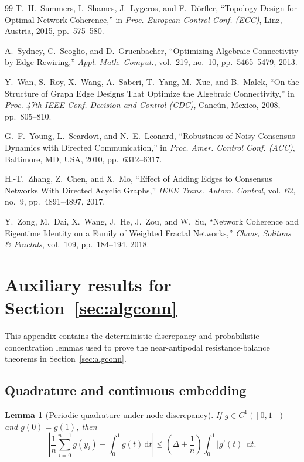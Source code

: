 \documentclass[11pt]{article}
\numberwithin{equation}{section}
\newtheorem{lemma}[theorem]{Lemma}
\theoremstyle{definition}
\theoremstyle{remark}
\begin{document}
\begin{thebibliography}{99}
	T.~H.~Summers, I.~Shames, J.~Lygeros, and F.~D{\"o}rfler,
	``Topology Design for Optimal Network Coherence,''
	in \emph{Proc. European Control Conf. (ECC)}, Linz, Austria, 2015, pp.~575--580.
	
	A.~Sydney, C.~Scoglio, and D.~Gruenbacher,
	``Optimizing Algebraic Connectivity by Edge Rewiring,''
	\emph{Appl. Math. Comput.}, vol.~219, no.~10, pp.~5465--5479, 2013.
	
	Y.~Wan, S.~Roy, X.~Wang, A.~Saberi, T.~Yang, M.~Xue, and B.~Malek,
	``On the Structure of Graph Edge Designs That Optimize the Algebraic Connectivity,''
	in \emph{Proc. 47th IEEE Conf. Decision and Control (CDC)}, Canc\'un, Mexico, 2008, pp.~805--810.
	
	G.~F.~Young, L.~Scardovi, and N.~E.~Leonard,
	``Robustness of Noisy Consensus Dynamics with Directed Communication,''
	in \emph{Proc. Amer. Control Conf. (ACC)}, Baltimore, MD, USA, 2010, pp.~6312--6317.
	
	H.-T.~Zhang, Z.~Chen, and X.~Mo,
	``Effect of Adding Edges to Consensus Networks With Directed Acyclic Graphs,''
	\emph{IEEE Trans. Autom. Control}, vol.~62, no.~9, pp.~4891--4897, 2017.
	
	Y.~Zong, M.~Dai, X.~Wang, J.~He, J.~Zou, and W.~Su,
	``Network Coherence and Eigentime Identity on a Family of Weighted Fractal Networks,''
	\emph{Chaos, Solitons \& Fractals}, vol.~109, pp.~184--194, 2018.
	
\end{thebibliography}



\appendix
\section{Auxiliary results for Section~\ref{sec:algconn}}
\label{app:auxiliary-results}
This appendix contains the deterministic discrepancy and probabilistic concentration lemmas used to prove the near-antipodal resistance-balance theorems in Section~\ref{sec:algconn}.

\subsection{Quadrature and continuous embedding}

\begin{lemma}[Periodic quadrature under node discrepancy]\label{lem:quadrature_discrepancy}
	If $g\in C^1([0,1])$ and $g(0)=g(1)$, then
	\[
	\left|
	\frac1n\sum_{i=0}^{n-1}g(y_i)-\int_0^1g(t)\,\mathrm dt
	\right|
	\le
	\left(\Delta+\frac1n\right)\int_0^1|g'(t)|\,\mathrm dt.
	\]
\end{lemma}
\end{document}
